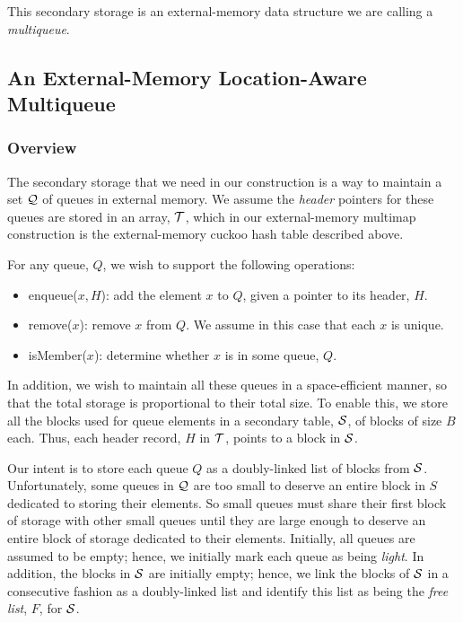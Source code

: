 \documentclass[11pt,letterpaper]{article}
\begin{document}
This secondary storage is an external-memory data structure we
are calling a \emph{multiqueue}.

\subsection{An External-Memory Location-Aware Multiqueue}
\label{sec:multiqueue}
\subsubsection{Overview}
The secondary storage
that we need in our construction is a
way to maintain a set $\cal Q$ of queues in external memory.
We assume
the \emph{header} pointers for these queues are 
stored in an array, $\cal T$,
which in our external-memory multimap construction is the
external-memory cuckoo hash table described above.

For any queue, $Q$, we wish to support the following operations:
\begin{itemize}
\item
enqueue($x,H$):
add the element $x$ to $Q$, given a pointer to its header, $H$. 
\item
remove($x$): remove $x$ from $Q$.
We assume in this case that each $x$ is unique.
\item
isMember($x$): determine whether $x$ is in some queue, $Q$.
\end{itemize}

In addition, we wish to maintain all these queues in a space-efficient
manner, so that the total storage is proportional to their total size.
To enable this, we store
all the blocks used for queue elements in a secondary table,
$\cal S$, of blocks of size $B$ each.
Thus, each header record, $H$ in $\cal T$, points to a block in $\cal S$.

Our intent is to store each queue $Q$ as a doubly-linked
list of blocks from $\cal S$.  Unfortunately, some queues in $\cal Q$ are too
small to deserve an entire block in $S$ dedicated to storing their elements.
So small queues must share their first block of storage with other small
queues until they are large enough to deserve an entire block of storage
dedicated to their elements.
Initially, all queues are assumed to be empty; hence, we initially
mark each queue as
being \emph{light}.
In addition, the blocks in $\cal S$ are initially empty; hence, we link the
blocks of $\cal S$ in a consecutive fashion as a doubly-linked list and
identify this list as being the \emph{free list}, $F$, for $\cal S$.
\end{document}
